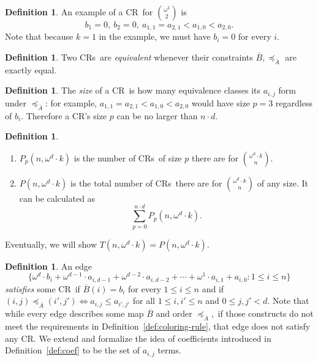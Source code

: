 \documentclass[10pt,a4paper]{article}
\newcommand{\om}{\omega}
\newcommand{\crulenospace}{CR}
\newcommand{\crule}{\crulenospace~}
\newcommand{\crules}{\crulenospace s~}
\newcommand{\xleq}{\preceq_{\overline{A}}}
\newcommand{\assny}{\overline{B}}
\newcommand{\numpoints}{n}
\newcommand{\inumpoints}{i}
\newcommand{\idegr}{j}
\newcommand{\commonconst}{a}
\newcommand{\rareconst}{b}
\theoremstyle{plain}
\theoremstyle{definition}
\newtheorem{definition}[theorem]{Definition}
\begin{document}
\begin{definition}
An example of a \crule for $\binom{\om^2}{2}$ is $$\rareconst_1=0,~\rareconst_2=0,~\commonconst_{1, 1} = \commonconst_{2, 1} < \commonconst_{1, 0} < \commonconst_{2, 0}.$$
Note that because $k=1$ in the example, we must have $\rareconst_{\inumpoints} = 0$ for every $\inumpoints$.


\end{definition}

\begin{definition}\label{def:crule-equivalence}
    Two \crules are \textit{equivalent} whenever their constraints $\assny, \xleq$ are
    exactly equal.
\end{definition}

\begin{definition} 
The \textit{size} of a \crule is how many equivalence classes its $\commonconst_{\inumpoints,\idegr}$ form under $\xleq$: 
for example, $\commonconst_{1, 1} = \commonconst_{2, 1} < \commonconst_{1, 0} < \commonconst_{2, 0}$ would have size $p=3$ regardless of $\rareconst_{\inumpoints}$. Therefore a \crulenospace's size $p$ can be no larger than $\numpoints \cdot d$.
\end{definition}
\begin{definition}~
\begin{enumerate}
\item 
$P_p \left(\numpoints,\om^d \cdot k \right)$ is the number of \crules of size $p$ there are for $\binom{\omega^d \cdot k}{\numpoints}$. 
\item 
$P\left(\numpoints,\om^d \cdot k\right)$ is the total number of \crules there are for $\binom{\omega^d \cdot k}{\numpoints}$ of any size. It can be calculated as $$
\sum_{p=0}^{\numpoints \cdot d} P_p(\numpoints, \om^d \cdot k).
$$
\end{enumerate}
\end{definition}
Eventually,
we will show $T(\numpoints,\om^d \cdot k) = P(\numpoints,\om^d \cdot k)$.

\begin{definition}\label{def:crule-coef}
An edge $$\{\om^d \cdot \rareconst_{\inumpoints} + \om^{d-1} \cdot \commonconst_{\inumpoints,d-1} + \om^{d-2} \cdot \commonconst_{\inumpoints,d-2} + \cdots + \om^1 \cdot \commonconst_{\inumpoints,1} + \commonconst_{\inumpoints,0} \colon 1 \leq \inumpoints \leq \numpoints\}$$
\textit{satisfies} some \crule if $\assny(\inumpoints) = \rareconst_{\inumpoints}$ for every $1 \leq \inumpoints \leq \numpoints$ and if 
$(\inumpoints,\idegr) \xleq (\inumpoints',\idegr') \iff \commonconst_{\inumpoints,\idegr} \leq \commonconst_{\inumpoints',\idegr'}$ for all $1 \leq \inumpoints,\inumpoints' \leq \numpoints$ and $0 \leq \idegr, \idegr' < d.$
Note that while every edge describes some map $\assny$ and order $\xleq,$ if those constructs
do not meet the requirements in Definition~\ref{def:coloring-rule},
that edge does not satisfy any \crulenospace. We extend and formalize the idea of
coefficients introduced in Definition~\ref{def:coef} to be the set of
$a_{i,j}$ terms.
\end{definition}
\end{document}
